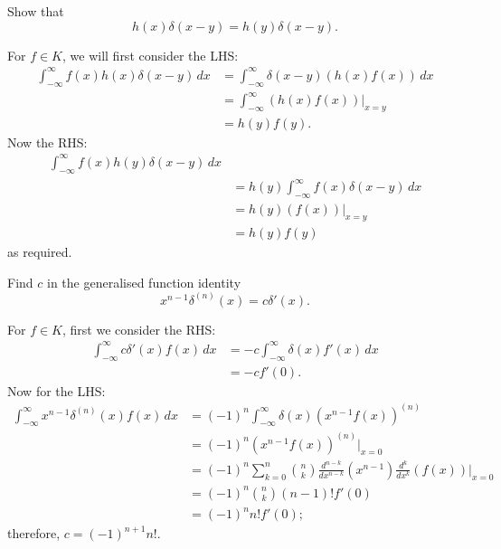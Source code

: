 \begin{example}
    Show that 
    \[
        h(x)\delta(x-y) = h(y)\delta(x-y).
    \]
\end{example}

\begin{solution}
    For $f \in K$, we will first consider the LHS:
    \begin{align*}
        \int_{-\infty}^{\infty} f(x) h(x) \delta(x-y) \,dx
        &= \int_{-\infty}^{\infty} \delta(x-y) (h(x)f(x)) \,dx \\
        &= \int_{-\infty}^{\infty} (h(x)f(x)) \rvert_{x=y} \\
        &= h(y)f(y).
    \end{align*}
    Now the RHS:
    \begin{align*}
        \int_{-\infty}^{\infty} f(x) h(y) \delta(x-y) \,dx \\
        &= h(y) \int_{-\infty}^{\infty} f(x) \delta(x-y) \,dx \\
        &= h(y) (f(x)) \rvert_{x=y} \\
        &= h(y)f(y)
    \end{align*}
    as required.
\end{solution}

\begin{example}
    Find $c$ in the generalised function identity
    \[
        x^{n-1} \delta^{(n)}(x) = c \delta'(x).
    \]
\end{example}

\begin{solution}
    For $f \in K$, first we consider the RHS:
    \begin{align*}
        \int_{-\infty}^{\infty} c\delta'(x) f(x) \,dx
        &= -c\int_{-\infty}^{\infty} \delta(x) f'(x) \,dx \\
        &= -c f'(0).
    \end{align*}
    Now for the LHS:
    \begin{align*}
        \int_{-\infty}^{\infty} x^{n-1} \delta^{(n)}(x) f(x) \,dx
        &= (-1)^n \int_{-\infty}^{\infty} \delta(x) (x^{n-1}f(x))^{(n)} \\
        &= (-1)^n (x^{n-1}f(x))^{(n)} \rvert_{x=0} \\
        &= (-1)^n \sum_{k=0}^n \binom{n}{k} 
            \frac{d^{n-k}}{dx^{n-k}} (x^{n-1}) \frac{d^k}{dx^k} (f(x)) \rvert_{x=0} \\
        &= (-1)^n \binom nk (n-1)! f'(0) \\
        &= (-1)^n n! f'(0);
    \end{align*}
    therefore, $c = (-1)^{n+1} n!$.
\end{solution}
